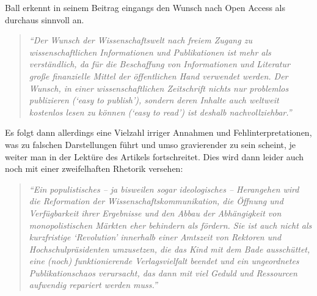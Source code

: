 \documentclass[a4paper,
fontsize=11pt,
oneside,
numbers=noperiodatend,
parskip=half-,
bibliography=totoc,
final
]{scrartcl}
\begin{document}
Ball erkennt in seinem Beitrag eingangs den Wunsch nach Open Access als
durchaus sinnvoll an.

\begin{quote}
\emph{\enquote{Der Wunsch der Wissenschaftswelt nach freiem Zugang zu
wissenschaftlichen Informationen und Publikationen ist mehr als
verständlich, da für die Beschaffung von Informationen und Literatur
große finanzielle Mittel der öffentlichen Hand verwendet werden. Der
Wunsch, in einer wissenschaftlichen Zeitschrift nichts nur problemlos
publizieren (\enquote{easy to publish}), sondern deren Inhalte auch
weltweit kostenlos lesen zu können (\enquote{easy to read}) ist deshalb
nachvollziehbar.}}
\end{quote}

Es folgt dann allerdings eine Vielzahl irriger Annahmen und
Fehlinterpretationen, was zu falschen Darstellungen führt und umso
gravierender zu sein scheint, je weiter man in der Lektüre des Artikels
fortschreitet. Dies wird dann leider auch noch mit einer zweifelhaften
Rhetorik versehen:

\begin{quote}
\emph{\enquote{Ein populistisches -- ja bisweilen sogar ideologisches --
Herangehen wird die Reformation der Wissenschaftskommunikation, die
Öffnung und Verfügbarkeit ihrer Ergebnisse und den Abbau der
Abhängigkeit von monopolistischen Märkten eher behindern als fördern.
Sie ist auch nicht als kurzfristige \enquote{Revolution} innerhalb einer
Amtszeit von Rektoren und Hochschulpräsidenten umzusetzen, die das Kind
mit dem Bade ausschüttet, eine (noch) funktionierende Verlagsvielfalt
beendet und ein ungeordnetes Publikationschaos verursacht, das dann mit
viel Geduld und Ressourcen aufwendig repariert werden muss.}}
\end{quote}
\end{document}
